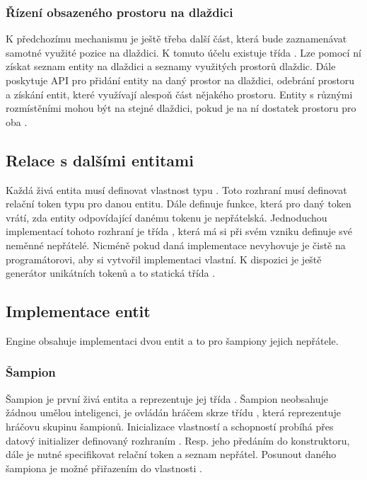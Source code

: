 \subsubsection{Řízení obsazeného prostoru na dlaždici}

K předchozímu mechanismu je ještě třeba další část, která bude zaznamenávat samotné využité pozice na dlaždici. K tomuto 
účelu existuje třída .  Lze pomocí ní získat seznam entity na dlaždici a seznamy využitých prostorů dlaždic.
Dále poskytuje API pro přidání entity na daný prostor na dlaždici, odebrání prostoru a získání entit, které využívají 
alespoň část nějakého prostoru. Entity s různými rozmístěními mohou být na stejné dlaždici, pokud
je na ní dostatek prostoru pro oba .


\subsection{Relace s dalšími entitami}

Každá živá entita musí definovat vlastnost typu . Toto rozhraní musí definovat relační token typu
 pro danou entitu. Dále definuje funkce, která pro daný token vrátí, zda entity odpovídající danému 
tokenu je nepřátelská. Jednoduchou implementací tohoto rozhraní je třída , která má
si při svém vzniku definuje své neměnné nepřátelé. Nicméně pokud daná implementace nevyhovuje je čistě na programátorovi,
aby si vytvořil implementaci vlastní. K dispozici je ještě generátor unikátních tokenů a to statická třída .

\subsection{Implementace entit}
Engine obsahuje implementaci dvou entit a to pro šampiony jejich nepřátele.

\subsubsection{Šampion}
Šampion je první živá
entita a reprezentuje jej třída . Šampion neobsahuje žádnou umělou inteligenci, je ovládán hráčem skrze
třídu , která reprezentuje hráčovu skupinu šampionů. Inicializace vlastností a schopností probíhá přes
datový initializer definovaný rozhraním . Resp. jeho předáním do konstruktoru, dále je nutné
specifikovat relační token a seznam nepřátel. Posunout daného šampiona je možné přiřazením do vlastnosti .

